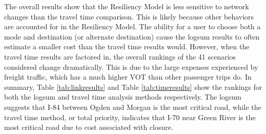 The overall results show that the Resiliency Model is less sensitive to
network changes than the travel time comparison. This is likely because
other behaviors are accounted for in the Resiliency Model. The ability for a user to
choose both a mode and destination (or alternate destination) cause the
logsum results to often estimate a smaller cost than the travel time
results would. However, when the travel time results are factored in, the
overall rankings of the 41 scenarios considered change dramatically. This
is due to the large expenses experienced by freight traffic, which has a
much higher VOT than other passenger trips do. In summary, Table
\ref{tab:linkresults} and Table \ref{tab:timeresults} show the rankings
for both the logsum and travel time analysis methods respectively. The
logsum suggests that I-84 between Ogden and Morgan is the most critical
road, while the travel time method, or total priority, indicates that I-70
near Green River is the most critical road due to cost associated with
closure.
